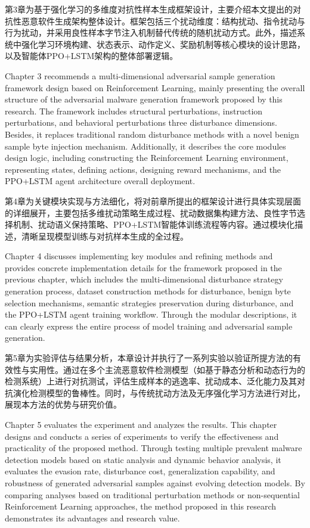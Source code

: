第3章为基于强化学习的多维度对抗性样本生成框架设计，主要介绍本文提出的对抗性恶意软件生成架构整体设计。框架包括三个扰动维度：结构扰动、指令扰动与行为扰动，并采用良性样本字节注入机制替代传统的随机扰动方式。此外，描述系统中强化学习环境构建、状态表示、动作定义、奖励机制等核心模块的设计思路，以及智能体PPO+LSTM架构的整体部署逻辑。

Chapter 3 recommends a multi-dimensional adversarial sample generation framework design based on Reinforcement Learning, mainly presenting the overall structure of the adversarial malware generation framework proposed by this research. The framework includes structural perturbations, instruction perturbations, and behavioral perturbations three disturbance dimensions. Besides, it replaces traditional random disturbance methods with a novel benign sample byte injection mechanism. Additionally, it describes the core modules design logic, including constructing the Reinforcement Learning environment, representing states, defining actions, designing reward mechanisms, and the PPO+LSTM agent architecture overall deployment.

第4章为关键模块实现与方法细化，将对前章所提出的框架设计进行具体实现层面的详细展开，主要包括多维扰动策略生成过程、扰动数据集构建方法、良性字节选择机制、扰动语义保持策略、PPO+LSTM智能体训练流程等内容。通过模块化描述，清晰呈现模型训练与对抗样本生成的全过程。

Chapter 4 discusses implementing key modules and refining methods and provides concrete implementation details for the framework proposed in the previous chapter, which includes the multi-dimensional disturbance strategy generation process, dataset construction methods for disturbance, benign byte selection mechanisms, semantic strategies preservation during disturbance, and the PPO+LSTM agent training workflow. Through the modular descriptions, it can clearly express the entire process of model training and adversarial sample generation.

第5章为实验评估与结果分析，本章设计并执行了一系列实验以验证所提方法的有效性与实用性。通过在多个主流恶意软件检测模型（如基于静态分析和动态行为的检测系统）上进行对抗测试，评估生成样本的逃逸率、扰动成本、泛化能力及其对抗演化检测模型的鲁棒性。同时，与传统扰动方法及无序强化学习方法进行对比，展现本方法的优势与研究价值。

Chapter 5 evaluates the experiment and analyzes the results. This chapter designs and conducts a series of experiments to verify the effectiveness and practicality of the proposed method. Through testing multiple prevalent malware detection models based on static analysis and dynamic behavior analysis, it evaluates the evasion rate, disturbance cost, generalization capability, and robustness of generated adversarial samples against evolving detection models. By comparing analyses based on traditional perturbation methods or non-sequential Reinforcement Learning approaches, the method proposed in this research demonstrates its advantages and research value.

